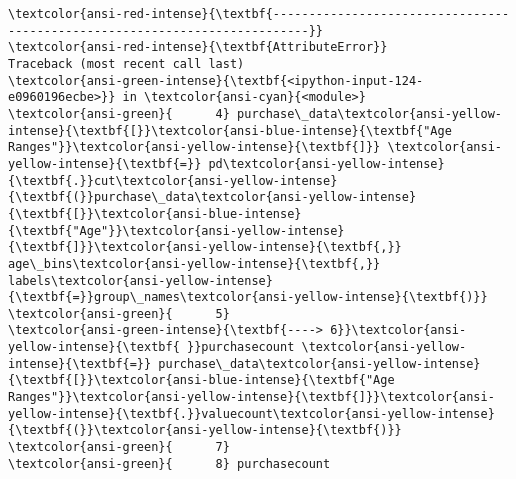 \documentclass[11pt]{article}
\begin{document}
    \begin{Verbatim}[commandchars=\\\{\}, frame=single, framerule=2mm, rulecolor=\color{outerrorbackground}]
\textcolor{ansi-red-intense}{\textbf{---------------------------------------------------------------------------}}
\textcolor{ansi-red-intense}{\textbf{AttributeError}}                            Traceback (most recent call last)
\textcolor{ansi-green-intense}{\textbf{<ipython-input-124-e0960196ecbe>}} in \textcolor{ansi-cyan}{<module>}
\textcolor{ansi-green}{      4} purchase\_data\textcolor{ansi-yellow-intense}{\textbf{[}}\textcolor{ansi-blue-intense}{\textbf{"Age Ranges"}}\textcolor{ansi-yellow-intense}{\textbf{]}} \textcolor{ansi-yellow-intense}{\textbf{=}} pd\textcolor{ansi-yellow-intense}{\textbf{.}}cut\textcolor{ansi-yellow-intense}{\textbf{(}}purchase\_data\textcolor{ansi-yellow-intense}{\textbf{[}}\textcolor{ansi-blue-intense}{\textbf{"Age"}}\textcolor{ansi-yellow-intense}{\textbf{]}}\textcolor{ansi-yellow-intense}{\textbf{,}} age\_bins\textcolor{ansi-yellow-intense}{\textbf{,}} labels\textcolor{ansi-yellow-intense}{\textbf{=}}group\_names\textcolor{ansi-yellow-intense}{\textbf{)}}
\textcolor{ansi-green}{      5} 
\textcolor{ansi-green-intense}{\textbf{----> 6}}\textcolor{ansi-yellow-intense}{\textbf{ }}purchasecount \textcolor{ansi-yellow-intense}{\textbf{=}} purchase\_data\textcolor{ansi-yellow-intense}{\textbf{[}}\textcolor{ansi-blue-intense}{\textbf{"Age Ranges"}}\textcolor{ansi-yellow-intense}{\textbf{]}}\textcolor{ansi-yellow-intense}{\textbf{.}}valuecount\textcolor{ansi-yellow-intense}{\textbf{(}}\textcolor{ansi-yellow-intense}{\textbf{)}}
\textcolor{ansi-green}{      7} 
\textcolor{ansi-green}{      8} purchasecount


\end{Verbatim}
\end{document}

